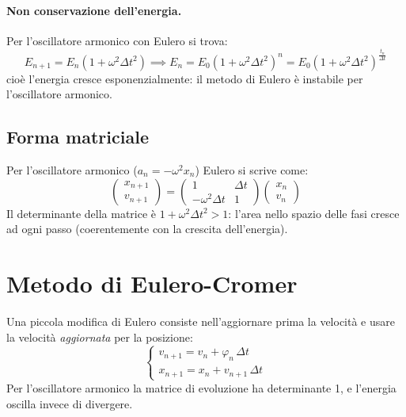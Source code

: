 \documentclass[11pt, a4paper, openright]{book}
\theoremstyle{plain}
\theoremstyle{definition}
\theoremstyle{remark}
\begin{document}
\paragraph{Non conservazione dell'energia.} Per l'oscillatore armonico con Eulero si trova:
\begin{equation}
    E_{n + 1} = E_n\left(1 + \omega^2\Delta t^2\right) \implies E_n = E_0\left(1 + \omega^2\Delta t^2\right)^{n} = E_0\left(1 + \omega^2\Delta t^2\right)^{\frac{t_n}{\Delta t}}
\end{equation}
cioè l'energia cresce esponenzialmente: il metodo di Eulero è instabile per l'oscillatore armonico.

\subsection{Forma matriciale}
Per l'oscillatore armonico ($a_n = -\omega^2x_n$) Eulero si scrive come:
\begin{equation}
    \begin{pmatrix} x_{n + 1} \\ v_{n + 1}\end{pmatrix} = \begin{pmatrix} 1 & \Delta t \\ -\omega^2\Delta t & 1\end{pmatrix}\begin{pmatrix} x_n \\ v_n\end{pmatrix}
\end{equation}
Il determinante della matrice è $1 + \omega^2\Delta t^2 > 1$: l'area nello spazio delle fasi cresce ad ogni passo (coerentemente con la crescita dell'energia).

\section{Metodo di Eulero-Cromer}
Una piccola modifica di Eulero consiste nell'aggiornare prima la velocità e usare la velocità \emph{aggiornata} per la posizione:
\begin{equation}
    \begin{cases}
        v_{n + 1} = v_n + \varphi_n\,\Delta t \\
        x_{n + 1} = x_n + v_{n + 1}\,\Delta t
    \end{cases}
\end{equation}
Per l'oscillatore armonico la matrice di evoluzione ha determinante 1, e l'energia oscilla invece di divergere.
\end{document}
